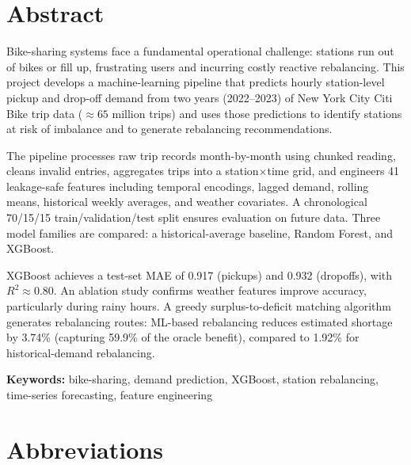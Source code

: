 \documentclass[12pt,a4paper]{report}
\begin{document}
\chapter*{Abstract}

\noindent Bike-sharing systems face a fundamental operational
challenge: stations run out of bikes or fill up, frustrating users
and incurring costly reactive rebalancing. This project develops a
machine-learning pipeline that predicts hourly station-level pickup
and drop-off demand from two years (2022--2023) of New York City
Citi Bike trip data ($\approx 65$ million trips) and uses those
predictions to identify stations at risk of imbalance and to generate
rebalancing recommendations.

The pipeline processes raw trip records month-by-month using chunked
reading, cleans invalid entries, aggregates trips into a
station$\times$time grid, and engineers 41 leakage-safe features
including temporal encodings, lagged demand, rolling means,
historical weekly averages, and weather covariates. A chronological
70/15/15 train/validation/test split ensures evaluation on future
data. Three model families are compared: a historical-average
baseline, Random Forest, and XGBoost.

XGBoost achieves a test-set MAE of 0.917 (pickups) and 0.932
(dropoffs), with $R^2 \approx 0.80$. An ablation study confirms
weather features improve accuracy, particularly during rainy hours.
A greedy surplus-to-deficit matching algorithm generates
rebalancing routes: ML-based rebalancing reduces estimated shortage
by 3.74\% (capturing 59.9\% of the oracle benefit), compared to
1.92\% for historical-demand rebalancing.

\vspace{0.2in}
\noindent\textbf{Keywords:} bike-sharing, demand prediction, XGBoost,
station rebalancing, time-series forecasting, feature engineering

\clearpage
\tableofcontents
\clearpage
\listoffigures
\clearpage
\listoftables
\clearpage

\chapter*{Abbreviations}
\end{document}
